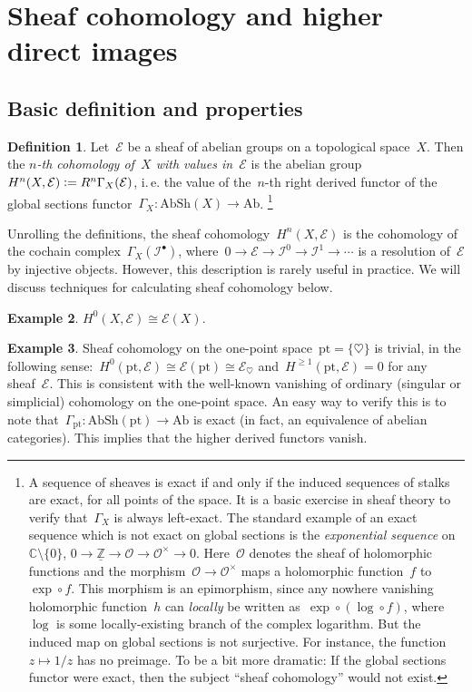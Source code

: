 \documentclass[10pt]{amsart}
\makeatletter
\theoremstyle{definition}
\newtheorem{defn}{Definition}[section]
\newtheorem{ex}[defn]{Example}
\theoremstyle{plain}
\theoremstyle{remark}
\newcommand{\E}{\mathcal{E}}
\newcommand{\I}{\mathcal{I}}
\renewcommand{\O}{\mathcal{O}}
\newcommand{\ZZ}{\mathbb{Z}}
\newcommand{\CC}{\mathbb{C}}
\newcommand{\Ab}{\mathrm{Ab}}
\newcommand{\AbSh}{\mathrm{AbSh}}
\newcommand{\defeq}{\vcentcolon=}
\newcommand{\ie}{i.\,e.\@\xspace}
\newcommand{\pt}{\mathrm{pt}}
\makeatother
\begin{document}
\section{Sheaf cohomology and higher direct images}

\subsection{Basic definition and properties}

\begin{defn}Let~$\E$ be a sheaf of abelian groups on a topological space~$X$.
Then the \emph{$n$-th cohomology of~$X$ with values in~$\E$} is the abelian
group $H^n(X, \E) \defeq R^n\Gamma_X(\E)$, \ie the value of the~$n$-th right
derived functor of the global sections functor~$\Gamma_X : \AbSh(X) \to \Ab$.%
\footnote{A sequence of sheaves is exact if and only if the induced sequences of
stalks are exact, for all points of the space. It is a basic exercise in sheaf
theory to verify that~$\Gamma_X$ is always left-exact. The standard example of
an exact sequence which is not exact on global sections is the
\emph{exponential sequence} on~$\CC \setminus \{0\}$, $0 \to \underline{\ZZ} \to \O \to
\O^\times \to 0$. Here~$\O$ denotes the sheaf of holomorphic functions and the
morphism~$\O \to \O^\times$ maps a holomorphic function~$f$ to~$\exp \circ f$.
This morphism is an epimorphism, since any nowhere vanishing holomorphic
function~$h$ can \emph{locally} be written as~$\exp \circ (\log \circ f)$,
where~$\log$ is some locally-existing branch of the complex logarithm. But the
induced map on global sections is not surjective. For instance, the function~$z
\mapsto 1/z$ has no preimage. To be a bit more dramatic: If the global sections
functor were exact, then the subject ``sheaf cohomology'' would not
exist.}
\end{defn}

Unrolling the definitions, the sheaf cohomology~$H^n(X,\E)$ is the cohomology
of the cochain complex~$\Gamma_X(\I^\bullet)$, where~$0 \to \E \to \I^0 \to \I^1
\to \cdots$ is a resolution of~$\E$ by injective objects. However, this
description is rarely useful in practice. We will discuss techniques for
calculating sheaf cohomology below.

\begin{ex}$H^0(X,\E) \cong \E(X)$.\end{ex}

\begin{ex}Sheaf cohomology on the one-point space~$\pt = \{ \heartsuit \}$ is
trivial, in the following sense:~$H^0(\pt,\E) \cong \E(\pt) \cong \E_\heartsuit$
and~$H^{\geq 1}(\pt,\E) = 0$ for any sheaf~$\E$. This is consistent with the
well-known vanishing of ordinary (singular or simplicial) cohomology on the
one-point space. An easy way to verify this is to note that~$\Gamma_\pt :
\AbSh(\pt) \to \Ab$ is exact (in fact, an equivalence of abelian categories).
This implies that the higher derived functors vanish.\end{ex}
\end{document}
